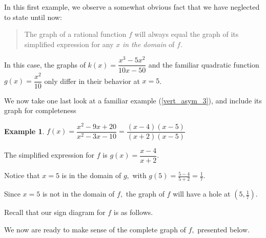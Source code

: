 \documentclass[12pt]{book}
\theoremstyle{definition}
\newtheorem{example}{Example}
\begin{document}
In this first example, we observe a somewhat obvious fact that we have neglected to state until now:
\begin{quote}
The graph of a rational function $f$ will always equal the graph of its simplified expression for any $x$ {\it in the domain} of $f$.
\end{quote}
In this case, the graphs of $k(x)=\dfrac{x^3-5x^2}{10x-50}$ and the familiar quadratic function $g(x)=\dfrac{x^2}{10}$ only differ in their behavior at $x=5$.
\par
We now take one last look at a familiar example (\ref{vert_asym_3}), and include its graph for completeness
\begin{example}
$f(x)=\dfrac{x^2-9x+20}{x^2-3x-10}=\dfrac{(x-4)(x-5)}{(x+2)(x-5)}$
\par
The simplified expression for $f$ is $g(x)=\dfrac{x-4}{x+2}$.
\par
Notice that $x=5$ is in the domain of $g,$ with $g(5)=\frac{5-4}{5+2}=\frac{1}{7}$.
\par
Since $x=5$ is not in the domain of $f,$ the graph of $f$ will have a hole at $(5,\frac{1}{7})$.
\par
Recall that our sign diagram for $f$ is as follows.
\begin{center}
\end{center}
We now are ready to make sense of the complete graph of $f,$ presented below.
\begin{center}
\end{center}
\end{example}
\end{document}
